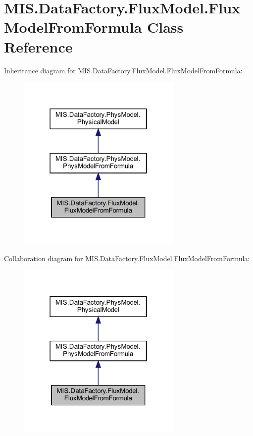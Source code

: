 \hypertarget{classMIS_1_1DataFactory_1_1FluxModel_1_1FluxModelFromFormula}{}\section{M\+I\+S.\+Data\+Factory.\+Flux\+Model.\+Flux\+Model\+From\+Formula Class Reference}
\label{classMIS_1_1DataFactory_1_1FluxModel_1_1FluxModelFromFormula}


Inheritance diagram for M\+I\+S.\+Data\+Factory.\+Flux\+Model.\+Flux\+Model\+From\+Formula\+:
\nopagebreak
\begin{figure}[H]
\begin{center}
\leavevmode
\includegraphics[width=226pt]{classMIS_1_1DataFactory_1_1FluxModel_1_1FluxModelFromFormula__inherit__graph}
\end{center}
\end{figure}


Collaboration diagram for M\+I\+S.\+Data\+Factory.\+Flux\+Model.\+Flux\+Model\+From\+Formula\+:
\nopagebreak
\begin{figure}[H]
\begin{center}
\leavevmode
\includegraphics[width=226pt]{classMIS_1_1DataFactory_1_1FluxModel_1_1FluxModelFromFormula__coll__graph}
\end{center}
\end{figure}
